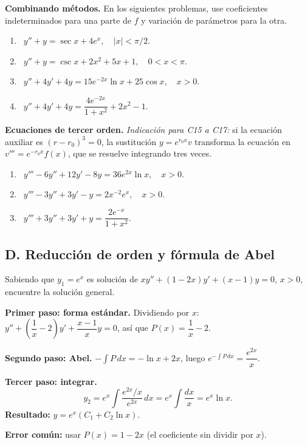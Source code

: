 \noindent\textbf{Combinando m\'etodos.} En los siguientes problemas, use coeficientes indeterminados para una parte de $f$ y variaci\'on de par\'ametros para la otra.

\begin{enumerate}[label=\textbf{C\arabic*.}, leftmargin=*, resume]
    \item \medio\ $y''+y=\sec x+4e^x,\quad |x|<\pi/2$.
    \item \medio\ $y''+y=\csc x+2x^2+5x+1,\quad 0<x<\pi$.
    \item \medio\ $y''+4y'+4y=15e^{-2x}\ln x+25\cos x,\quad x>0$.
    \item \medio\ $y''+4y'+4y=\dfrac{4e^{-2x}}{1+x^2}+2x^2-1$.
\end{enumerate}

\noindent\textbf{Ecuaciones de tercer orden.} \textit{Indicaci\'on para C15 a C17:} si la ecuaci\'on auxiliar es $(r-r_0)^3=0$, la sustituci\'on $y=e^{r_0x}v$ transforma la ecuaci\'on en $v'''=e^{-r_0x}f(x)$, que se resuelve integrando tres veces.

\begin{enumerate}[label=\textbf{C\arabic*.}, leftmargin=*, resume]
    \item \dificil\ $y'''-6y''+12y'-8y=36e^{2x}\ln x,\quad x>0$.
    \item \dificil\ $y'''-3y''+3y'-y=2x^{-2}e^x,\quad x>0$.
    \item \dificil\ $y'''+3y''+3y'+y=\dfrac{2e^{-x}}{1+x^2}$.
\end{enumerate}

\subsection*{D. Reducci\'on de orden y f\'ormula de Abel}

\begin{example}
    Sabiendo que $y_1=e^x$ es soluci\'on de $xy''+(1-2x)y'+(x-1)y=0$, $x>0$, encuentre la soluci\'on general.

    \textbf{Primer paso: forma est\'andar.} Dividiendo por $x$: $y''+\left(\dfrac1x-2\right)y'+\dfrac{x-1}{x}y=0$, as\'i que $P(x)=\dfrac1x-2$.

    \textbf{Segundo paso: Abel.} $-\int P\,dx=-\ln x+2x$, luego $e^{-\int P\,dx}=\dfrac{e^{2x}}{x}$.

    \textbf{Tercer paso: integrar.}
    \[
    y_2=e^x\int\dfrac{e^{2x}/x}{e^{2x}}\,dx=e^x\int\dfrac{dx}{x}=e^x\ln x.
    \]
    \textbf{Resultado:} $y=e^x\left(C_1+C_2\ln x\right)$.

    \textbf{Error com\'un:} usar $P(x)=1-2x$ (el coeficiente sin dividir por $x$).
\end{example}

